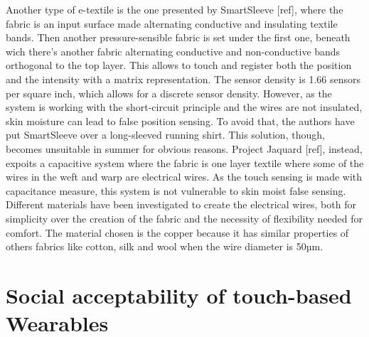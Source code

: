 \documentclass{sigchi}
\begin{document}
Another type of e-textile is the one presented by SmartSleeve [ref], where the fabric is an input surface made alternating conductive and insulating textile bands. Then another pressure-sensible fabric is set under the first one, beneath wich there’s another fabric alternating conductive and non-conductive bands  orthogonal to the top layer. This allows to touch and register both the position and the intensity with a matrix representation. The sensor density is 1.66 sensors per square inch, which allows for a discrete sensor density. However, as the system is working with the short-circuit principle and the wires are not insulated, skin moisture can lead to false position sensing. To avoid that, the authors have put SmartSleeve over a long-sleeved running shirt. This solution, though, becomes unsuitable in summer for obvious reasons. %
%
Project Jaquard [ref], instead, expoits a capacitive system where the fabric is one layer textile where some of the wires in the weft and warp are electrical wires. As the touch sensing is made with capacitance measure, this system is not vulnerable to skin moist false sensing. Different materials have been investigated to create the electrical wires, both for simplicity over the creation of the fabric and the necessity of flexibility needed for comfort. The material chosen is the copper because it has similar properties of others fabrics like cotton, silk and wool when the wire diameter is 50µm.
%
%
%


\section{Social acceptability of touch-based Wearables}
\end{document}
